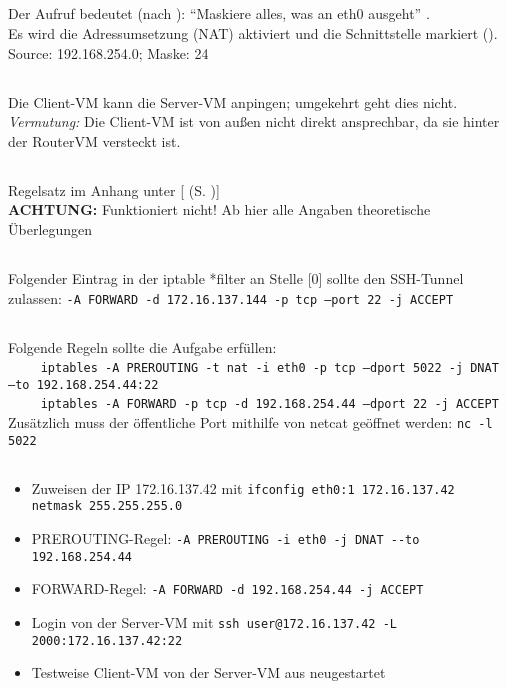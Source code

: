 \documentclass[twoside]{article}
\newcommand{\say}[1]{%
	``#1''%
}
\newcommand{\ttt}[1]{%
	\texttt{#1}%
}
\newcommand{\mref}[1]{[\nameref{#1} (S. \pageref{#1})]}
\begin{document}
	\subsection{}
	\label{ssec:3.1}
	Der Aufruf bedeutet (nach \cite{nat}): \say{Maskiere alles, was an eth0 ausgeht}.\\
	Es wird die Adressumsetzung (NAT) aktiviert und die Schnittstelle markiert (\cite{ubuntu:nat}).\\
	Source: 192.168.254.0; Maske: 24
	\subsection{}
	\label{ssec:3.2}
	Die Client-VM kann die Server-VM anpingen; umgekehrt geht dies nicht.\\
	\textit{Vermutung:} Die Client-VM ist von außen nicht direkt ansprechbar, da sie hinter der RouterVM versteckt ist.
	\subsection{}
	\label{ssec:3.3}
	Regelsatz im Anhang unter \mref{3.3-1}\\
	\textbf{ACHTUNG:} Funktioniert nicht!
	Ab hier alle Angaben theoretische Überlegungen
	\subsection{}
	\label{ssec:3.4}
	Folgender Eintrag in der iptable *filter an Stelle [0] sollte den SSH-Tunnel zulassen: \ttt{-A FORWARD -d 172.16.137.144 -p tcp --port 22 -j ACCEPT}
	\subsection{}
	\label{ssec:3.5}
	Folgende Regeln sollte die Aufgabe erfüllen:\\
	\-~~~~\ttt{iptables -A PREROUTING -t nat -i eth0 -p tcp --dport 5022 -j DNAT --to 192.168.254.44:22}\\
	\-~~~~\ttt{iptables -A FORWARD -p tcp -d 192.168.254.44 --dport 22 -j ACCEPT}\\
	Zusätzlich muss der öffentliche Port mithilfe von netcat geöffnet werden: \ttt{nc -l 5022}
	\subsection{}
	\begin{itemize}
		\item Zuweisen der IP 172.16.137.42 mit \ttt{ifconfig eth0:1 172.16.137.42 netmask 255.255.255.0}
		\item PREROUTING-Regel: \ttt{-A PREROUTING -i eth0 -j DNAT {-}{-}to 192.168.254.44}
		\item FORWARD-Regel: \ttt{-A FORWARD -d 192.168.254.44 -j ACCEPT}
		\item Login von der Server-VM mit \ttt{ssh user@172.16.137.42 -L 2000:172.16.137.42:22}
		\item Testweise Client-VM von der Server-VM aus neugestartet
	\end{itemize}
	\label{ssec:3.6}
\end{document}
